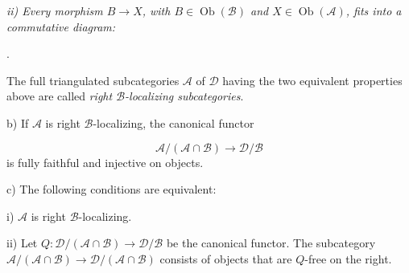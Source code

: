 \clearpage
{}%
\begingroup
\small
\setlength{\parskip}{0pt}%
\setlength{\emergencystretch}{1.5em}%
\setlength{\abovedisplayskip}{3pt plus 1pt minus 1pt}%
\setlength{\belowdisplayskip}{3pt plus 1pt minus 1pt}%

\begingroup\itshape
{}
\noindent\hspace{1.2em}ii) Every morphism $B\longrightarrow X$, with
$B\in\operatorname{Ob}(\mathcal B)$ and $X\in\operatorname{Ob}(\mathcal A)$,
fits into a commutative diagram:

\begin{center}
  \quad .
\end{center}

The full triangulated subcategories $\mathcal A$ of $\mathcal D$ having the
two equivalent properties above are called \emph{right
$\mathcal B$-localizing subcategories}.

\par\noindent b) If $\mathcal A$ is right $\mathcal B$-localizing, the
canonical functor

\[
  \mathcal A/(\mathcal A\cap\mathcal B)
  \longrightarrow\mathcal D/\mathcal B
\]
is fully faithful and injective on objects.

\par\noindent c) The following conditions are equivalent:

\par\noindent\hspace{1.2em}i) $\mathcal A$ is right
$\mathcal B$-localizing.

\par\noindent\hspace{1.2em}ii) Let
$Q\colon\mathcal D/(\mathcal A\cap\mathcal B)\longrightarrow
\mathcal D/\mathcal B$ be the canonical functor. The subcategory
$\mathcal A/(\mathcal A\cap\mathcal B)\longrightarrow
\mathcal D/(\mathcal A\cap\mathcal B)$ consists of objects that are
$Q$-free on the right.
\endgroup

